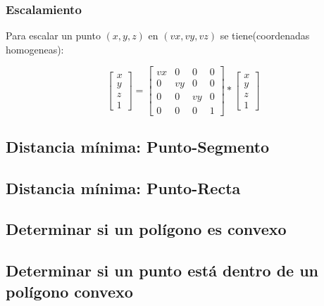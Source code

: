\documentclass[10pt,letterpaper,twocolumn,twosided]{article}
\newcommand{\codigofuente}[1]{

\dotfill
}
\begin{document}
\subsubsection{Escalamiento}

Para escalar un punto $(x,y,z)$ en $(vx,vy,vz)$ se tiene(coordenadas homogeneas):

\[
 \begin{bmatrix}
  x \\
  y \\
  z  \\
  1
 \end{bmatrix}
 =
 \begin{bmatrix}
  vx & 0 & 0 & 0\\
  0 & vy & 0 & 0\\
  0 & 0 & vy & 0\\
  0 & 0 & 0 & 1 
 \end{bmatrix}
 *
 \begin{bmatrix}
  x \\
  y \\
  z \\
  1
 \end{bmatrix}
\]



\subsection{Distancia mínima: Punto-Segmento}

\codigofuente{src/geom/minDistanceSgmntPnt.cpp}

\subsection{Distancia mínima: Punto-Recta}

\codigofuente{src/geom/punto_recta.cpp}

\subsection{Determinar si un polígono es convexo}

\codigofuente{src/geom/ifconvexpolygon.cpp}

\subsection{Determinar si un punto está dentro de un polígono convexo}

\codigofuente{src/geom/pointInaconvexpolygon.cpp}
\end{document}
